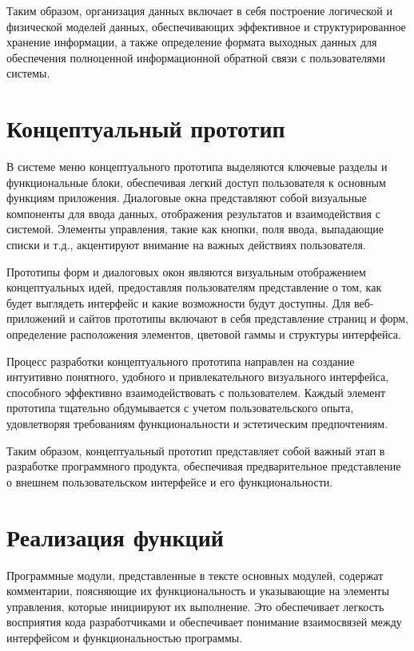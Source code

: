 \documentclass[12pt,a4paper,draft]{report}
\begin{document}
Таким образом, организация данных включает в себя построение логической и физической моделей данных, обеспечивающих эффективное и структурированное хранение информации, а также определение формата выходных данных для обеспечения полноценной информационной обратной связи с пользователями системы.

\section{Концептуальный прототип}

В системе меню концептуального прототипа выделяются ключевые разделы и функциональные блоки, обеспечивая легкий доступ пользователя к основным функциям приложения.
Диалоговые окна представляют собой визуальные компоненты для ввода данных, отображения результатов и взаимодействия с системой.
Элементы управления, такие как кнопки, поля ввода, выпадающие списки и т.д., акцентируют внимание на важных действиях пользователя.

Прототипы форм и диалоговых окон являются визуальным отображением концептуальных идей, предоставляя пользователям представление о том, как будет выглядеть интерфейс и какие возможности будут доступны.
Для веб-приложений и сайтов прототипы включают в себя представление страниц и форм, определение расположения элементов, цветовой гаммы и структуры интерфейса.

Процесс разработки концептуального прототипа направлен на создание интуитивно понятного, удобного и привлекательного визуального интерфейса, способного эффективно взаимодействовать с пользователем.
Каждый элемент прототипа тщательно обдумывается с учетом пользовательского опыта, удовлетворяя требованиям функциональности и эстетическим предпочтениям.

Таким образом, концептуальный прототип представляет собой важный этап в разработке программного продукта, обеспечивая предварительное представление о внешнем пользовательском интерфейсе и его функциональности.

\section{Реализация функций}


Программные модули, представленные в тексте основных модулей, содержат комментарии, поясняющие их функциональность и указывающие на элементы управления, которые инициируют их выполнение.
Это обеспечивает легкость восприятия кода разработчиками и обеспечивает понимание взаимосвязей между интерфейсом и функциональностью программы.
\end{document}
